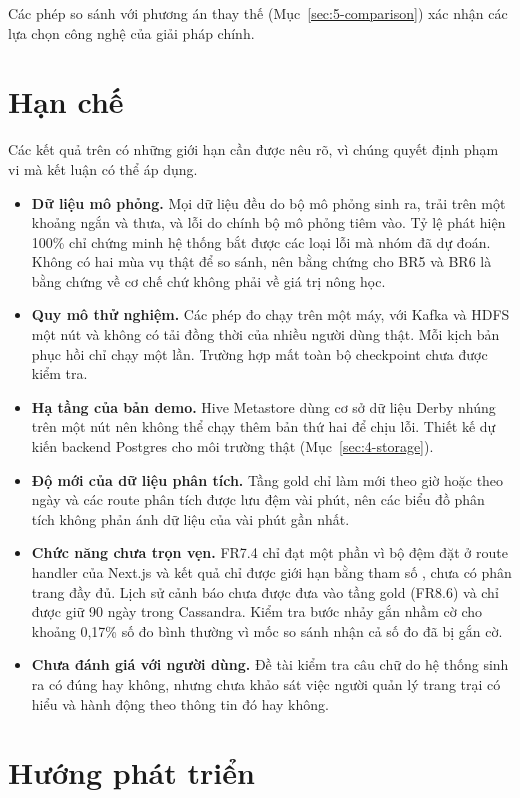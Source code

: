 Các phép so sánh với phương án thay thế (Mục~\ref{sec:5-comparison}) xác nhận các lựa chọn công nghệ của giải pháp chính.

\section{Hạn chế}
\label{sec:6-limits}

Các kết quả trên có những giới hạn cần được nêu rõ, vì chúng quyết định phạm vi mà kết luận có thể áp dụng.

\begin{itemize}
  \item \textbf{Dữ liệu mô phỏng.} Mọi dữ liệu đều do bộ mô phỏng sinh ra, trải trên một khoảng ngắn và thưa, và lỗi do chính bộ mô phỏng tiêm vào. Tỷ lệ phát hiện 100\% chỉ chứng minh hệ thống bắt được các loại lỗi mà nhóm đã dự đoán. Không có hai mùa vụ thật để so sánh, nên bằng chứng cho BR5 và BR6 là bằng chứng về cơ chế chứ không phải về giá trị nông học.
  \item \textbf{Quy mô thử nghiệm.} Các phép đo chạy trên một máy, với Kafka và HDFS một nút và không có tải đồng thời của nhiều người dùng thật. Mỗi kịch bản phục hồi chỉ chạy một lần. Trường hợp mất toàn bộ checkpoint chưa được kiểm tra.
  \item \textbf{Hạ tầng của bản demo.} Hive Metastore dùng cơ sở dữ liệu Derby nhúng trên một nút nên không thể chạy thêm bản thứ hai để chịu lỗi. Thiết kế dự kiến backend Postgres cho môi trường thật (Mục~\ref{sec:4-storage}).
  \item \textbf{Độ mới của dữ liệu phân tích.} Tầng gold chỉ làm mới theo giờ hoặc theo ngày và các route phân tích được lưu đệm vài phút, nên các biểu đồ phân tích không phản ánh dữ liệu của vài phút gần nhất.
  \item \textbf{Chức năng chưa trọn vẹn.} FR7.4 chỉ đạt một phần vì bộ đệm đặt ở route handler của Next.js và kết quả chỉ được giới hạn bằng tham số , chưa có phân trang đầy đủ. Lịch sử cảnh báo chưa được đưa vào tầng gold (FR8.6) và chỉ được giữ 90 ngày trong Cassandra. Kiểm tra bước nhảy gắn nhầm cờ cho khoảng 0,17\% số đo bình thường vì mốc so sánh nhận cả số đo đã bị gắn cờ.
  \item \textbf{Chưa đánh giá với người dùng.} Đề tài kiểm tra câu chữ do hệ thống sinh ra có đúng hay không, nhưng chưa khảo sát việc người quản lý trang trại có hiểu và hành động theo thông tin đó hay không.
\end{itemize}

\section{Hướng phát triển}
\label{sec:6-future}

